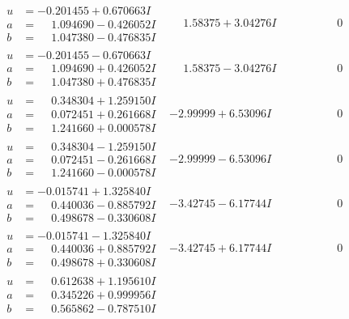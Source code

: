\documentclass[1p]{elsarticle_modified}
\theoremstyle{definition}
\begin{document}
$$\begin{array}{c|c|c}
\begin{aligned}
u &= -0.201455 + 0.670663 I \\
a &= \phantom{-}1.094690 - 0.426052 I \\
b &= \phantom{-}1.047380 - 0.476835 I\end{aligned}
 & \phantom{-}1.58375 + 3.04276 I & \phantom{-0.000000 } 0 \\ \hline\begin{aligned}
u &= -0.201455 - 0.670663 I \\
a &= \phantom{-}1.094690 + 0.426052 I \\
b &= \phantom{-}1.047380 + 0.476835 I\end{aligned}
 & \phantom{-}1.58375 - 3.04276 I & \phantom{-0.000000 } 0 \\ \hline\begin{aligned}
u &= \phantom{-}0.348304 + 1.259150 I \\
a &= \phantom{-}0.072451 + 0.261668 I \\
b &= \phantom{-}1.241660 + 0.000578 I\end{aligned}
 & -2.99999 + 6.53096 I & \phantom{-0.000000 } 0 \\ \hline\begin{aligned}
u &= \phantom{-}0.348304 - 1.259150 I \\
a &= \phantom{-}0.072451 - 0.261668 I \\
b &= \phantom{-}1.241660 - 0.000578 I\end{aligned}
 & -2.99999 - 6.53096 I & \phantom{-0.000000 } 0 \\ \hline\begin{aligned}
u &= -0.015741 + 1.325840 I \\
a &= \phantom{-}0.440036 - 0.885792 I \\
b &= \phantom{-}0.498678 - 0.330608 I\end{aligned}
 & -3.42745 - 6.17744 I & \phantom{-0.000000 } 0 \\ \hline\begin{aligned}
u &= -0.015741 - 1.325840 I \\
a &= \phantom{-}0.440036 + 0.885792 I \\
b &= \phantom{-}0.498678 + 0.330608 I\end{aligned}
 & -3.42745 + 6.17744 I & \phantom{-0.000000 } 0 \\ \hline\begin{aligned}
u &= \phantom{-}0.612638 + 1.195610 I \\
a &= \phantom{-}0.345226 + 0.999956 I \\
b &= \phantom{-}0.565862 - 0.787510 I\end{aligned}

\end{array}$$
\end{document}
